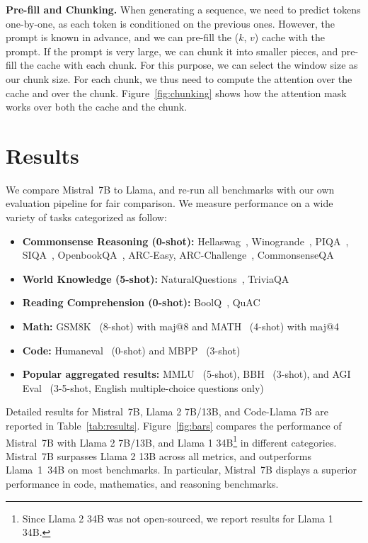  \textbf{Pre-fill and Chunking.} When generating a sequence, we need to predict tokens one-by-one, as each token is conditioned on the previous ones. However, the prompt is known in advance, and we can pre-fill the ($k$, $v$) cache with the prompt. If the prompt is very large, we can chunk it into smaller pieces, and pre-fill the cache with each chunk. For this purpose, we can select the window size as our chunk size. For each chunk, we thus need to compute the attention over the cache and over the chunk. 
Figure~\ref{fig:chunking} shows how the attention mask works over both the cache and the chunk.

\section{Results}

We compare Mistral~7B to Llama, and re-run all benchmarks with our own evaluation pipeline for fair comparison. We measure performance on a wide variety of tasks categorized as follow:

\begin{itemize}[leftmargin=10pt]
\item \textbf{Commonsense Reasoning (0-shot):} Hellaswag~\cite{zellers2019hellaswag}, Winogrande~\cite{sakaguchi2021winogrande}, PIQA~\cite{bisk2020piqa}, SIQA~\cite{sap2019socialiqa}, OpenbookQA~\cite{mihaylov2018can}, ARC-Easy, ARC-Challenge~\cite{clark2018think}, CommonsenseQA~\cite{talmor2018commonsenseqa}
\item \textbf{World Knowledge (5-shot):} NaturalQuestions~\cite{kwiatkowski2019natural}, TriviaQA~\cite{joshi2017triviaqa}
\item \textbf{Reading Comprehension (0-shot):} BoolQ~\cite{clark2019boolq}, QuAC~\cite{choi2018quac}
\item \textbf{Math:} GSM8K~\cite{cobbe2021training} (8-shot) with maj@8 and MATH~\cite{hendrycks2021measuring} (4-shot) with maj@4
\item \textbf{Code:} Humaneval~\cite{chen2021evaluating} (0-shot) and MBPP~\cite{austin2021program} (3-shot)
\item \textbf{Popular aggregated results:} MMLU~\cite{hendrycks2020measuring} (5-shot), BBH~\cite{suzgun2022challenging} (3-shot), and AGI Eval~\cite{zhong2023agieval} (3-5-shot, English multiple-choice questions only)
\end{itemize}

Detailed results for Mistral~7B, Llama 2 7B/13B, and Code-Llama 7B are reported in Table~\ref{tab:results}.
Figure~\ref{fig:bars} compares the performance of Mistral~7B with Llama 2 7B/13B, and Llama 1 34B\footnote{Since Llama 2 34B was not open-sourced, we report results for Llama 1 34B.} in different categories. Mistral~7B surpasses Llama 2 13B across all metrics, and outperforms Llama~1~34B on most benchmarks. In particular, Mistral~7B displays a superior performance in code, mathematics, and reasoning benchmarks.

